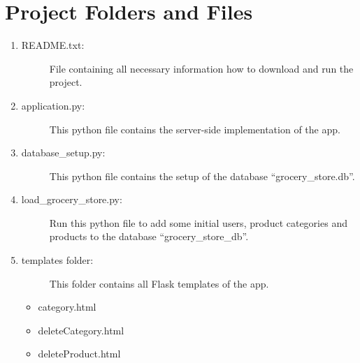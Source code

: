 \documentclass[letterpaper,10pt,english]{sphinxmanual}
\begin{document}
\chapter{Project Folders and Files}
\label{index:project-folders-and-files}\begin{enumerate}
\item {} \begin{description}
\item[{README.txt:}] \leavevmode
File containing all necessary information how to download and run the project.

\end{description}

\item {} \begin{description}
\item[{application.py:}] \leavevmode
This python file contains the server-side implementation of the app.

\end{description}

\item {} \begin{description}
\item[{database\_setup.py:}] \leavevmode
This python file contains the setup of the database ``grocery\_store.db''.

\end{description}

\item {} \begin{description}
\item[{load\_grocery\_store.py:}] \leavevmode
Run this python file to add some initial users, product categories and
products to the database ``grocery\_store\_db''.

\end{description}

\item {} \begin{description}
\item[{templates folder:}] \leavevmode
This folder contains all Flask templates of the app.

\end{description}
\begin{itemize}
\item {} 
category.html

\item {} 
deleteCategory.html

\item {} 
deleteProduct.html


\end{itemize}
\end{enumerate}
\end{document}
